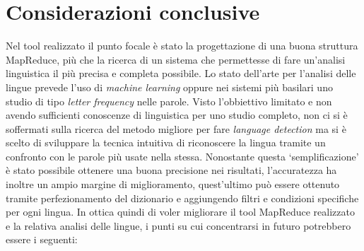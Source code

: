 \documentclass{article}
\newcommand{\MR}{MapReduce}
\begin{document}
\section{Considerazioni conclusive}
Nel tool realizzato il punto focale è stato la progettazione di una buona struttura \MR{}, più che la ricerca di un sistema che permettesse di fare un'analisi linguistica il più precisa e completa possibile. Lo stato dell'arte per l'analisi delle lingue prevede l'uso di \textit{machine learning} oppure nei sistemi più basilari uno studio di tipo \textit{letter frequency} nelle parole. Visto l'obbiettivo limitato e non avendo sufficienti conoscenze di linguistica per uno studio completo, non ci si è soffermati sulla ricerca del metodo migliore per fare \textit{language detection} ma si è scelto di sviluppare la tecnica intuitiva di riconoscere la lingua tramite un confronto con le parole più usate nella stessa. Nonostante questa `semplificazione' è stato possibile ottenere una buona precisione nei risultati, l'accuratezza ha inoltre un ampio margine di miglioramento, quest'ultimo può essere ottenuto tramite perfezionamento del dizionario e aggiungendo filtri e condizioni specifiche per ogni lingua. In ottica quindi di voler migliorare il tool \MR{} realizzato e la relativa analisi delle lingue, i punti su cui concentrarsi in futuro potrebbero essere i seguenti:
\end{document}
